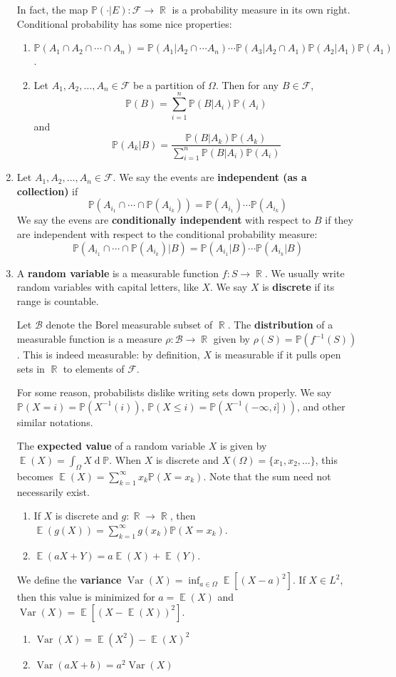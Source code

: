 \documentclass[12pt, a4paper]{article}
\DeclareMathOperator{\R}{\mathbb{R}}
\DeclareMathOperator{\E}{\mathbb{E}}
\DeclareMathOperator{\Var}{Var}
\renewcommand{\Pr}{\mathbb{P}}
\renewcommand{\d}[1]{\ensuremath{\operatorname{d}\!{#1}}} %
\theoremstyle{nonumberplain}
\begin{document}
\begin{enumerate}
        In fact, the map $\Pr(\cdot|E):\mathcal{F}\to\R$ is a probability measure in its own right.
        Conditional probability has some nice properties:
        \begin{enumerate}
            \item $\Pr(A_1\cap A_2\cap\cdots\cap A_n)=\Pr(A_1|A_2\cap\cdots A_n)\cdots\Pr(A_3|A_2\cap A_1)\Pr(A_2|A_1)\Pr(A_1)$.
            \item Let $A_1,A_2,\ldots,A_n\in\mathcal{F}$ be a partition of $\Omega$.
                Then for any $B\in\mathcal{F}$,
                \[\Pr(B)=\sum\limits_{i=1}^n\Pr(B|A_i)\Pr(A_i)\]
                and
                \[\Pr(A_k|B)=\frac{\Pr(B|A_k)\Pr(A_k)}{\sum\limits_{i=1}^n\Pr(B|A_i)\Pr(A_i)}\]
        \end{enumerate}
    \item Let $A_1,A_2,\ldots,A_n\in\mathcal{F}$.
        We say the events are \textbf{independent (as a collection)} if
        \[\Pr(A_{i_1}\cap\cdots\cap\Pr(A_{i_k}))=\Pr(A_{i_1})\cdots\Pr(A_{i_k})\]
        We say the evens are \textbf{conditionally independent} with respect to $B$ if they are independent with respect to the conditional probability measure:
        \[\Pr(A_{i_1}\cap\cdots\cap\Pr(A_{i_k})|B)=\Pr(A_{i_1}|B)\cdots\Pr(A_{i_k}|B)\]
    \item A \textbf{random variable} is a measurable function $f:S\to\R$.
        We usually write random variables with capital letters, like $X$.
        We say $X$ is \textbf{discrete} if its range is countable.

        Let $\mathcal{B}$ denote the Borel measurable subset of $\R$.
        The \textbf{distribution} of a measurable function is a measure $\rho:\mathcal{B}\to\R$ given by $\rho(S)=\Pr(f^{-1}(S))$.
        This is indeed measurable: by definition, $X$ is measurable if it pulls open sets in $\R$ to elements of $\mathcal{F}$.

        For some reason, probabilists dislike writing sets down properly.
        We say $\Pr(X=i)=\Pr(X^{-1}(i))$, $\Pr(X\leq i)=\Pr(X^{-1}(-\infty,i]))$, and other similar notations.

        The \textbf{expected value} of a random variable $X$ is given by $\E(X)=\int_\Omega X\d{\Pr}$.
        When $X$ is discrete and $X(\Omega)=\{x_1,x_2,\ldots\}$, this becomes $\E(X)=\sum\limits_{k=1}^\infty x_k\Pr(X=x_k)$.
        Note that the sum need not necessarily exist.
        \begin{enumerate}
            \item If $X$ is discrete and $g:\R\to\R$, then $\E(g(X))=\sum\limits_{k=1}^\infty g(x_k)\Pr(X=x_k)$.
            \item $\E(aX+Y)=a\E(X)+\E(Y)$.
        \end{enumerate}
        We define the \textbf{variance} $\Var(X)=\inf_{a\in\Omega}\E[(X-a)^2]$.
        If $X\in L^2$, then this value is minimized for $a=\E(X)$ and $\Var(X)=\E[(X-\E(X))^2]$.
        \begin{enumerate}
            \item $\Var(X)=\E(X^2)-\E(X)^2$
            \item $\Var(aX+b)=a^2\Var(X)$
        \end{enumerate}
\end{enumerate}
\end{document}
